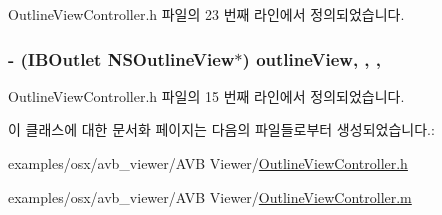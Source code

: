 Outline\+View\+Controller.\+h 파일의 23 번째 라인에서 정의되었습니다.

\subsubsection[{\texorpdfstring{outline\+View}{outlineView}}]{\setlength{\rightskip}{0pt plus 5cm}-\/ (I\+B\+Outlet N\+S\+Outline\+View$\ast$) outline\+View\hspace{0.3cm}{\ttfamily [read]}, {\ttfamily [write]}, {\ttfamily [atomic]}, {\ttfamily [weak]}}\hypertarget{interface_outline_view_controller_a2df5f78f79ebb8f68653c3b54304e6e8}{}\label{interface_outline_view_controller_a2df5f78f79ebb8f68653c3b54304e6e8}


Outline\+View\+Controller.\+h 파일의 15 번째 라인에서 정의되었습니다.



이 클래스에 대한 문서화 페이지는 다음의 파일들로부터 생성되었습니다.\+:\begin{DoxyCompactItemize}
\item 
examples/osx/avb\+\_\+viewer/\+A\+V\+B Viewer/\hyperlink{_outline_view_controller_8h}{Outline\+View\+Controller.\+h}\item 
examples/osx/avb\+\_\+viewer/\+A\+V\+B Viewer/\hyperlink{_outline_view_controller_8m}{Outline\+View\+Controller.\+m}\end{DoxyCompactItemize}
